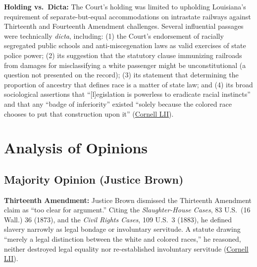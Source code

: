 \documentclass[12pt]{article}
\begin{document}
\textbf{Holding vs.\ Dicta:} The Court's holding was limited to upholding Louisiana's requirement of separate-but-equal accommodations on intrastate railways against Thirteenth and Fourteenth Amendment challenges. Several influential passages were technically \textit{dicta}, including: (1) the Court's endorsement of racially segregated public schools and anti-miscegenation laws as valid exercises of state police power; (2) its suggestion that the statutory clause immunizing railroads from damages for misclassifying a white passenger might be unconstitutional (a question not presented on the record); (3) its statement that determining the proportion of ancestry that defines race is a matter of state law; and (4) its broad sociological assertions that ``[l]egislation is powerless to eradicate racial instincts'' and that any ``badge of inferiority'' existed ``solely because the colored race chooses to put that construction upon it'' (\href{https://www.law.cornell.edu/supremecourt/text/163/537}{Cornell LII}).

\section{Analysis of Opinions}

\subsection{Majority Opinion (Justice Brown)}

\textbf{Thirteenth Amendment:} Justice Brown dismissed the Thirteenth Amendment claim as ``too clear for argument.'' Citing the \textit{Slaughter-House Cases}, 83 U.S.\ (16 Wall.) 36 (1873), and the \textit{Civil Rights Cases}, 109 U.S.\ 3 (1883), he defined slavery narrowly as legal bondage or involuntary servitude. A statute drawing ``merely a legal distinction between the white and colored races,'' he reasoned, neither destroyed legal equality nor re-established involuntary servitude (\href{https://www.law.cornell.edu/supremecourt/text/163/537}{Cornell LII}).
\end{document}
